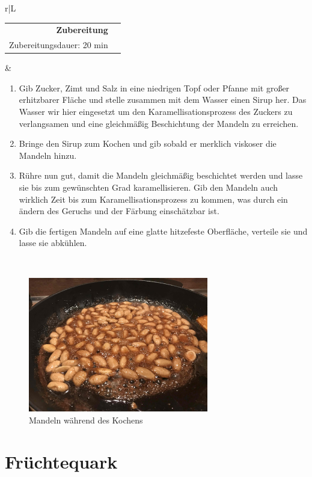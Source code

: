 \documentclass[a4paper, 12pt]{scrbook} 								%
\numberwithin{equation}{section} 									%
\begin{document}
\begin{tabularx}{\textwidth}{r|L}
		
			\begin{tabular}[t]{rr}
				\textbf{Zubereitung}	\\
				\small Zubereitungsdauer: 20 min 	\\
			\end{tabular}			&	\begin{enumerate}[]
											\item Gib Zucker, Zimt und Salz in eine niedrigen Topf oder Pfanne mit großer erhitzbarer Fläche und stelle zusammen mit dem Wasser einen Sirup her. Das Wasser wir hier eingesetzt um den Karamellisationsprozess des Zuckers zu verlangsamen und eine gleichmäßig Beschichtung der Mandeln zu erreichen.
											\item Bringe den Sirup zum Kochen und gib sobald er merklich viskoser die Mandeln hinzu.
											\item Rühre nun gut, damit die Mandeln gleichmäßig beschichtet werden und lasse sie bis zum gewünschten Grad karamellisieren. Gib den Mandeln auch wirklich Zeit bis zum Karamellisationsprozess zu kommen, was durch ein ändern des Geruchs und der Färbung einschätzbar ist.
											\item Gib die fertigen Mandeln auf eine glatte hitzefeste Oberfläche, verteile sie und lasse sie abkühlen.
										\end{enumerate}	\\
		\end{tabularx}

		\begin{figure}[h]
			\centering
			\includegraphics[width = 0.7\textwidth]{media/gebrannte_mandeln_schritt.jpg}
			\caption{Mandeln während des Kochens}
		\end{figure}


		\newpage


\section{Früchtequark}	\label{fruchtquark}
\end{document}

